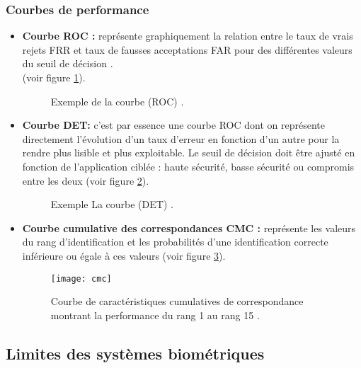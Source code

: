 \subsubsection{Courbes de performance }
\begin{itemize}
	\item \textbf{Courbe ROC : }représente graphiquement la relation entre le taux de vrais rejets FRR et taux de fausses acceptations FAR pour des différentes valeurs du seuil de décision \citep{egan1975signal}.\\
(voir figure \ref{fig:chapitre1roc}). 
	\begin{center}
		\begin{figure}[H]
			\centering
			\caption{Exemple de la courbe (ROC) \citep{Mainguet2017}.}
			\label{fig:chapitre1roc}
		\end{figure}
	\end{center}
	\item \textbf{Courbe DET: }c'est par essence une courbe ROC dont on représente directement l’évolution d’un taux d’erreur en fonction d’un autre pour la rendre plus lisible et plus exploitable. Le seuil de décision doit être ajusté en fonction de l'application ciblée : haute sécurité, basse sécurité ou compromis entre les deux (voir figure \ref{fig:chapitre1det}). 
	\begin{center}
		\begin{figure}[H]
			\centering
			\caption{Exemple La courbe (DET) \citep{Mainguet2017}.}
			\label{fig:chapitre1det}
		\end{figure}
	\end{center}
	\item \textbf{Courbe cumulative des correspondances CMC : }représente les valeurs du rang d’identification et les probabilités d’une identification correcte inférieure ou égale à ces valeurs (voir figure \ref{fig:chapitre1cmc}). 
	\begin{center}
		\begin{figure}[H]
			\centering
			\texttt{[image: cmc]}
			\caption{Courbe de caractéristiques cumulatives de correspondance montrant la performance du rang 1 au rang 15 \citep{Hu2015}.}
			\label{fig:chapitre1cmc}
		\end{figure}
	\end{center}
\end{itemize}

\subsection{Limites des systèmes biométriques}
\label{section:limitation}

